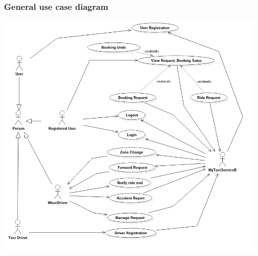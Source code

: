 \documentclass[11pt,titlepage]{article} %
\begin{document}
	\subsubsection{General use case diagram}
	\begin{center}
	\includegraphics[scale=0.52]{usecaseGeneral.png}
	\end{center}
\end{document}
